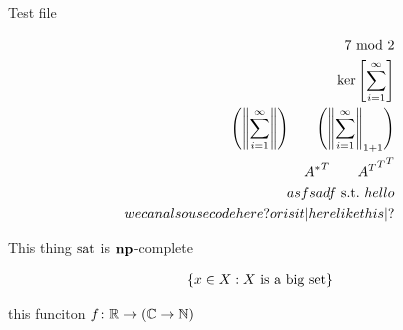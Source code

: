 \documentclass[12pt]{article}
\begin{document}
Test file

\begin{align*}
  \mod{7}{2} \\
  \ker{\sum_{i = 1}^\infty} \\
  \parens{\norm{\sum_{i = 1}^\infty}} \qquad
    \parens{\norm{\sum_{i = 1}^\infty}_{1 + 1}} \\
  \transp{\adj{A}} \qquad \transp{\transp{\transp{A}}} \\
  asfsadf \st hello \\
  we can also use \pinl{code here?} or is it \pinl|here like this|?
\end{align*}

This thing ${\text{sat}}$ is ${\mathbf{np}}$-complete

\begin{align*}
  {\left\{x \in X : \text{$X$ is a big set}\right\}}
\end{align*}

this funciton ${f \colon {\mathbb{R}} \to {\left({\mathbb{C}}\to {\mathbb{N}}\right)}}$
\end{document}
